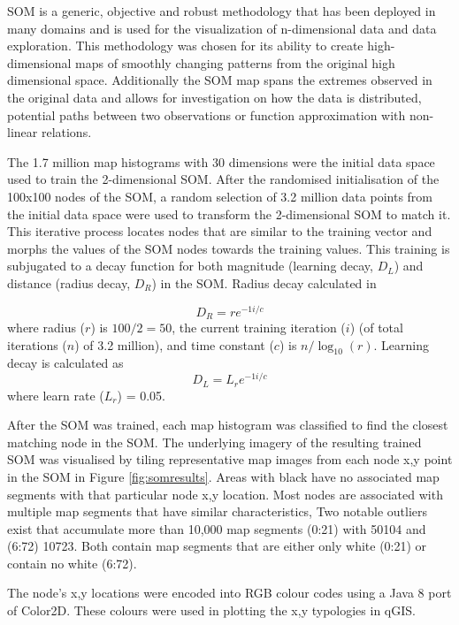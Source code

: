 \documentclass{nature}
\begin{document}
\begin{methods}
SOM is a generic, objective and robust methodology that has been deployed in many domains and is used for the visualization of n-dimensional data and data exploration\cite{Koleheimen2004}. This methodology was chosen for its ability to create high-dimensional maps of smoothly changing patterns from the original high dimensional space. Additionally the SOM map spans the extremes observed in the original data and allows for investigation on how the data is distributed, potential paths between two observations or function approximation with non-linear relations\cite{Barreto2006}. 

The 1.7 million map histograms with 30 dimensions were the initial data space used to train the 2-dimensional SOM. After the randomised initialisation of the 100x100 nodes of the SOM, a random selection of 3.2 million data points from the initial data space were used to transform the 2-dimensional SOM to match it. This iterative process locates nodes that are similar to the training vector and morphs the values of the SOM nodes towards the training values. This training is subjugated to a decay function for both magnitude (learning decay, $D_{L}$) and distance (radius decay, $D_{R}$) in the SOM. Radius decay calculated in

\begin{equation} 
D_{R} = r  e^{-1  i / c}
\end{equation}
where radius ($r$) is $100/2=50$, the current training iteration ($i$) (of total iterations ($n$) of 3.2 million), and time constant ($c$) is $n/ \log _{10} (r)$. Learning decay is calculated as
\begin{equation} 
D_{L} = L_{r}  e^{-1  i / c}
\end{equation}
where learn rate ($L_{r}$) = 0.05.

After the SOM was trained, each map histogram was classified to find the closest matching node in the SOM. The underlying imagery of the resulting trained SOM was visualised by tiling representative map images from each node x,y point in the SOM in Figure \ref{fig:somresults}. Areas with black have no associated map segments with that particular node x,y location. Most nodes are associated with multiple map segments that have similar characteristics, %
Two notable outliers exist that accumulate more than 10,000 map segments (0:21) with 50104 and (6:72) 10723. Both contain map segments that are either only white (0:21) or contain no white (6:72).

The node's x,y locations were encoded into RGB colour codes using a Java 8 port of Color2D\cite{Jackle2017,Steiger2015}. These colours were used in plotting the x,y typologies in qGIS\cite{QGIS2009}.



\end{methods}
\end{document}
